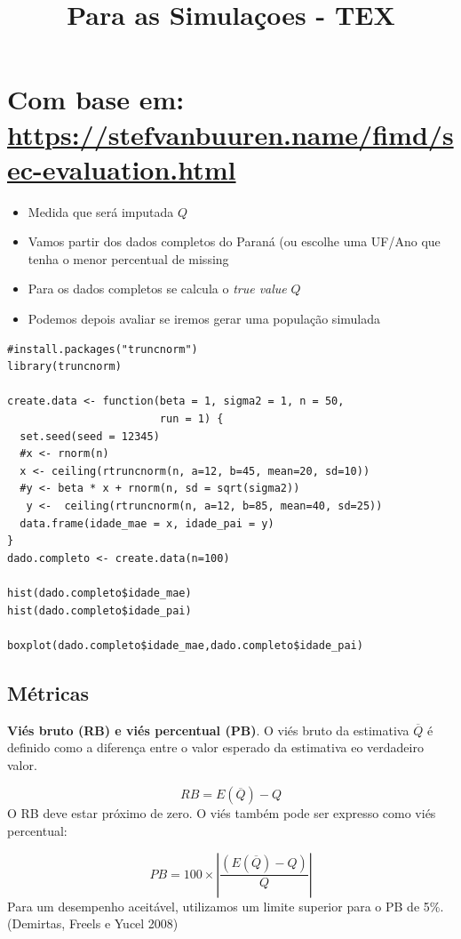 \documentclass[11pt]{article}
\title{Para as Simulaçoes - TEX}
\author{}
\date{}
\begin{document}
\maketitle
\section*{Com base em: \href{https://stefvanbuuren.name/fimd/sec-evaluation.html}{https://stefvanbuuren.name/fimd/sec-evaluation.html}}
\begin{itemize}
  \item Medida que será imputada $Q$
  \item Vamos partir dos dados completos do Paraná (ou escolhe uma UF/Ano que tenha o menor percentual de missing
  \item Para os dados completos se calcula o \textit{true value} $Q$
  \item Podemos depois avaliar se iremos gerar uma população simulada
\end{itemize}

\begin{verbatim}
#install.packages("truncnorm")
library(truncnorm)

create.data <- function(beta = 1, sigma2 = 1, n = 50,
                        run = 1) {
  set.seed(seed = 12345)
  #x <- rnorm(n)
  x <- ceiling(rtruncnorm(n, a=12, b=45, mean=20, sd=10))
  #y <- beta * x + rnorm(n, sd = sqrt(sigma2))
   y <-  ceiling(rtruncnorm(n, a=12, b=85, mean=40, sd=25))
  data.frame(idade_mae = x, idade_pai = y)
}
dado.completo <- create.data(n=100)

hist(dado.completo$idade_mae)
hist(dado.completo$idade_pai)

boxplot(dado.completo$idade_mae,dado.completo$idade_pai)
\end{verbatim}

\subsection*{Métricas}
\textbf{Viés bruto (RB) e viés percentual (PB)}. O viés bruto da estimativa  $\overline{Q}$  é definido como a diferença entre o valor esperado da estimativa eo verdadeiro valor.

$$
RB = E(\overline{Q}) - Q
$$  O RB deve estar próximo de zero. O viés também pode ser expresso como viés percentual:

$$
PB = 100 \times \left| \frac{(E(\overline{Q}) - Q)}{Q} \right|
$$  Para um desempenho aceitável, utilizamos um limite superior para o PB de 5\%. (Demirtas, Freels e Yucel 2008)
\end{document}
